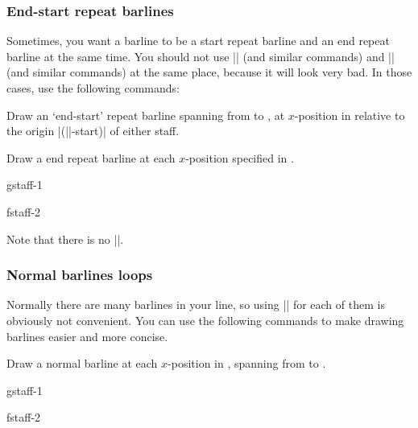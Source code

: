 \subsubsection{End-start repeat barlines}\label{sec:multistaff:barlines:endstart}
Sometimes, you want a barline to be a start repeat barline and an end repeat 
barline at the same time. You should not use |\tmstartrepeatbarline| (and 
similar commands) and |\tmendrepeatbarline| (and similar commands) at the 
same place, because it will look very bad. In those cases, use the following 
commands:
\begin{command}{\tmendstartrepeatbarline{}}
  Draw an `end-start' repeat barline spanning from  to 
  , at $x$-position  in relative to 
  the origin |(||-start)| of either staff.
\end{command}
\begin{command}{\tmendstartrepeatbarlineinline{}}
  Draw a end repeat barline at each $x$-position specified in .
\end{command}
\begin{codeexample}[]
\begin{tmline}%
\begin{tmstaff}{g}{staff-1}\end{tmstaff}%
\begin{tmstaff}{f}{staff-2}
\end{tmstaff}%
%
%
%
\end{tmline}
\end{codeexample}
Note that there is no |\tmendstartrepeatbarlineendline|.
\subsubsection{Normal barlines loops}\label{sec:multistaff:barlines:normal-loop}
Normally there are many barlines in your line, so using |\tmbarline| for 
each of them is obviously not convenient. You can use the following commands 
to make drawing barlines easier and more concise.
\begin{command}{\tmbarlineloop{}}
  Draw a normal barline at each $x$-position in , spanning 
  from  to .
\end{command}
\begin{codeexample}[]
\begin{tmline}%
\begin{tmstaff}{g}{staff-1}\end{tmstaff}%
\begin{tmstaff}{f}{staff-2}\end{tmstaff}%
%
\end{tmline}
\end{codeexample}
